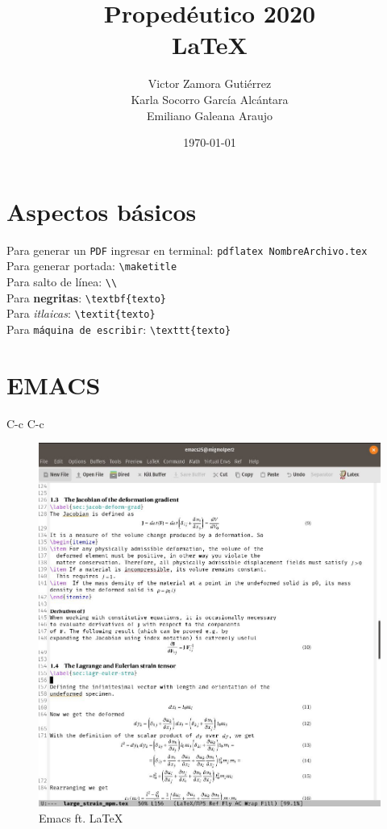 \documentclass[11pt]{article} %
\title{Propedéutico 2020 \\ \LaTeX}
\author{Victor Zamora Gutiérrez \\ Karla Socorro García Alcántara \\
  Emiliano Galeana Araujo}
\affil{Facultad de ciencias, UNAM}
\date{\today}
\begin{document}
\maketitle

\section{Aspectos básicos}

Para generar un \texttt{PDF} ingresar en terminal: \texttt{pdflatex
  NombreArchivo.tex}\\

Para generar portada: \verb!\maketitle!\\
Para salto de línea: \verb!\\!\\
Para \textbf{negritas}: \verb!\textbf{texto}!\\
Para \textit{itlaicas}: \verb!\textit{texto}!\\
Para \texttt{máquina de escribir}: \verb!\texttt{texto}!\\

\section{EMACS \Heart}
C-c C-c\\
\begin{figure}[H] %
  \begin{center}
    \includegraphics[width=450pt]{./emacs-LaTeX-1.jpg}  
    \caption{Emacs ft. \LaTeX \smiley}
  \end{center}
\end{figure}
\end{document}

